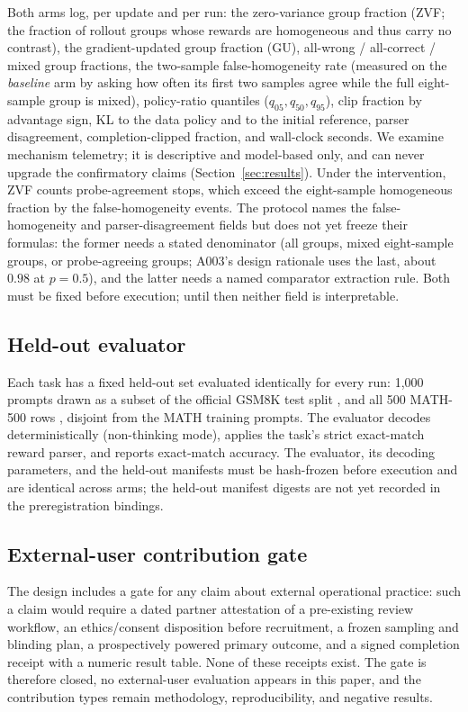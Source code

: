 \documentclass[11pt]{article}
\begin{document}
Both arms log, per update and per run: the zero-variance group fraction (ZVF; the fraction of rollout groups whose rewards are homogeneous and thus carry no contrast), the gradient-updated group fraction (GU), all-wrong / all-correct / mixed group fractions, the two-sample false-homogeneity rate (measured on the \emph{baseline} arm by asking how often its first two samples agree while the full eight-sample group is mixed), policy-ratio quantiles ($q_{05}, q_{50}, q_{95}$), clip fraction by advantage sign, KL to the data policy and to the initial reference, parser disagreement, completion-clipped fraction, and wall-clock seconds. We examine mechanism telemetry; it is descriptive and model-based only, and can never upgrade the confirmatory claims (Section~\ref{sec:results}). Under the intervention, ZVF counts probe-agreement stops, which exceed the eight-sample homogeneous fraction by the false-homogeneity events. The protocol names the false-homogeneity and parser-disagreement fields but does not yet freeze their formulas: the former needs a stated denominator (all groups, mixed eight-sample groups, or probe-agreeing groups; A003's design rationale uses the last, about $0.98$ at $p=0.5$), and the latter needs a named comparator extraction rule. Both must be fixed before execution; until then neither field is interpretable.

\subsection{Held-out evaluator}

Each task has a fixed held-out set evaluated identically for every run: 1{,}000 prompts drawn as a subset of the official GSM8K test split \citep{cobbe2021gsm8k}, and all 500 MATH-500 rows \citep{hendrycks2021math}, disjoint from the MATH training prompts. The evaluator decodes deterministically (non-thinking mode), applies the task's strict exact-match reward parser, and reports exact-match accuracy. The evaluator, its decoding parameters, and the held-out manifests must be hash-frozen before execution and are identical across arms; the held-out manifest digests are not yet recorded in the preregistration bindings.

\subsection{External-user contribution gate}

The design includes a gate for any claim about external operational practice: such a claim would require a dated partner attestation of a pre-existing review workflow, an ethics/consent disposition before recruitment, a frozen sampling and blinding plan, a prospectively powered primary outcome, and a signed completion receipt with a numeric result table. None of these receipts exist. The gate is therefore closed, no external-user evaluation appears in this paper, and the contribution types remain methodology, reproducibility, and negative results.
\end{document}
